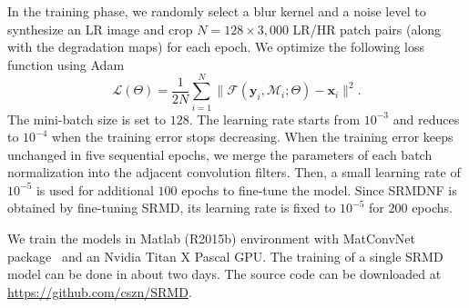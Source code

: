 \documentclass[10pt,twocolumn,letterpaper]{article}
\begin{document}
In the training phase, we randomly select a blur kernel and a noise level to synthesize an LR image and crop $N=128\times 3,000$ LR/HR patch pairs (along with the degradation maps) for each epoch.
We optimize the following loss function using Adam~\cite{kingma2014adam}
\begin{equation}\label{eq:loss}
  \mathcal{L}(\Theta) = \frac{1}{2N}\sum_{i=1}^N\|\mathcal{F}(\mathbf{y}_i, \mathbf{\mathcal{M}}_{i}; \Theta)  - \mathbf{x}_i \|^2.
\end{equation}
The mini-batch size is set to $128$. The learning rate starts from $10^{-3}$ and reduces to $10^{-4}$ when the training error stops decreasing. When the training error keeps unchanged in five sequential epochs, we merge the parameters of each batch normalization into the adjacent convolution filters. Then, a small learning rate of $10^{-5}$ is used for additional $100$ epochs to fine-tune the model. Since SRMDNF is obtained by fine-tuning SRMD, its learning rate is fixed to $10^{-5}$ for $200$ epochs.

We train the models in Matlab (R2015b) environment with MatConvNet package~\cite{vedaldi2015matconvnet} and an Nvidia Titan X Pascal GPU.
The training of a single SRMD model can be done in about two days.
The source code can be downloaded at \url{https://github.com/cszn/SRMD}.
\end{document}
